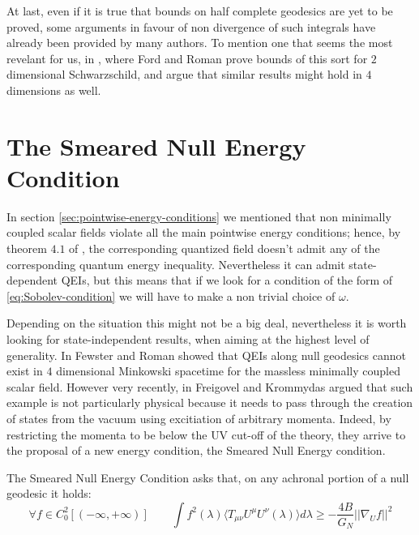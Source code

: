 At last, even if it is true that bounds on half complete geodesics are yet to be proved, some arguments in favour of non divergence of such integrals have already been provided by many authors. To mention one that seems the most revelant for us, in \cite[]{ford1996averaged}, where Ford and Roman prove bounds of this sort for \(2\) dimensional Schwarzschild, and argue that similar results might hold in \(4\) dimensions as well.

\section{The Smeared Null Energy Condition}
\label{sec:SNEC}

In section \ref{sec:pointwise-energy-conditions} we mentioned that non minimally coupled scalar fields violate all the main pointwise energy conditions; hence, by theorem \(4.1\) of \cite[]{kontou2020energy}, the corresponding quantized field doesn't admit any of the corresponding quantum energy inequality. Nevertheless it can admit state-dependent QEIs, but this means that if we look for a condition of the form of \eqref{eq:Sobolev-condition} we will have to make a non trivial choice of \(\omega\).

Depending on the situation this might not be a big deal, nevertheless it is worth looking for state-independent results, when aiming at the highest level of generality.
In \cite[]{fewster2003null} Fewster and Roman showed that QEIs along null geodesics cannot exist in \(4\) dimensional Minkowski spacetime for the massless minimally coupled scalar field. However very recently, in \cite[]{freivogel2018smeared} Freigovel and Krommydas argued that such example is not particularly physical because it needs to pass through the creation of states from the vacuum using excitiation of arbitrary momenta. Indeed, by restricting the momenta to be below the UV cut-off of the theory, they arrive to the proposal of a new energy condition, the Smeared Null Energy condition.

\begin{definition}
	The Smeared Null Energy Condition asks that, on any achronal portion of a null geodesic it holds:
	\begin{equation}
		\label{eq:SNEC}
		\forall f \in C_0^2[(-\infty, +\infty)] \quad\quad \int f^2(\lambda)\langle T_{\mu\nu}U^{\mu}U^{\nu}(\lambda) \rangle d\lambda \ge -\frac{4B}{G_N}\vert\vert \nabla_U f\vert\vert^2
	\end{equation}
\end{definition}

